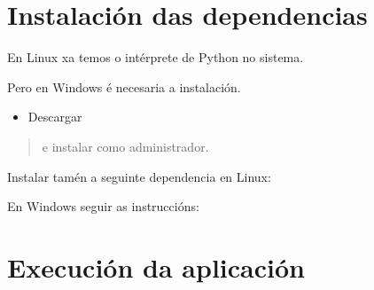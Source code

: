 \documentclass[letterpaper,10pt,spanish]{sphinxmanual}
\begin{document}
\section{Instalación das dependencias}
\label{\detokenize{README:instalacion-das-dependencias}}
\sphinxAtStartPar
En Linux xa temos o intérprete de Python no sistema.

\sphinxAtStartPar
Pero en Windows é necesaria a instalación.
\begin{itemize}
\item {} 
\sphinxAtStartPar
Descargar 

\end{itemize}
\begin{quote}

\sphinxAtStartPar
e instalar como administrador.
\end{quote}

\sphinxAtStartPar
Instalar tamén a seguinte dependencia en Linux:

\sphinxAtStartPar
{}

\sphinxAtStartPar
En Windows seguir as instruccións:

\sphinxAtStartPar
{}


\section{Execución da aplicación}
\label{\detokenize{README:execucion-da-aplicacion}}
\sphinxAtStartPar
{}
\end{document}
